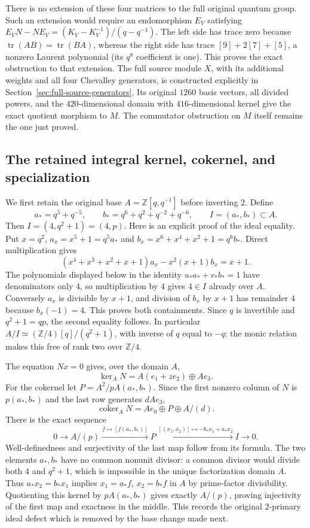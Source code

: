 There is no extension of these four matrices to the full original
quantum group. Such an extension would require an endomorphism $E_V$
satisfying $E_VN-NE_V=(K_V-K_V^{-1})/(q-q^{-1})$. The left side has
trace zero because $\operatorname{tr}(AB)=\operatorname{tr}(BA)$,
whereas the right side has trace $[9]+2[7]+[5]$, a nonzero Laurent
polynomial (its $q^8$ coefficient is one). This proves the exact
obstruction to that extension. The full source module $X$, with
its additional weights and all four Chevalley generators, is constructed
explicitly in Section~\ref{sec:full-source-generators}. Its original
$1260$ basis vectors, all divided powers, and the $420$-dimensional
domain with $416$-dimensional kernel give the exact quotient
morphism to $M$. The commutator obstruction on $M$ itself remains
the one just proved.

\subsection{The retained integral kernel, cokernel, and specialization}

We first retain the original base $A=\mathbb Z[q,q^{-1}]$ before
inverting $2$. Define
\[
 a_*=q^5+q^{-5},\qquad b_*=q^6+q^2+q^{-2}+q^{-6},\qquad
 I=(a_*,b_*)\subset A.
\]
Then $I=(4,q^2+1)=(4,p)$. Here is an explicit proof of the ideal
equality. Put $x=q^2$, $a_x=x^5+1=q^5a_*$ and
$b_x=x^6+x^4+x^2+1=q^6b_*$. Direct multiplication gives
\[
 (x^4+x^3+x^2+x+1)a_x-x^2(x+1)b_x=x+1.
\]
The polynomials displayed below in the identity
$u_*a_*+v_*b_*=1$ have denominators only $4$, so multiplication by
$4$ gives $4\in I$ already over $A$. Conversely $a_x$ is divisible
by $x+1$, and division of $b_x$ by $x+1$ has remainder $4$ because
$b_x(-1)=4$. This proves both containments. Since $q$ is invertible
and $q^2+1=qp$, the second equality follows. In particular
$A/I\simeq(\mathbb Z/4)[q]/(q^2+1)$, with inverse of $q$ equal to
$-q$; the monic relation makes this free of rank two over $\mathbb Z/4$.

The equation $Nx=0$ gives, over the domain $A$,
\[
 \ker_AN=A(e_1+ze_2)\oplus Ae_3.
\]
For the cokernel let $P=A^2/pA(a_*,b_*)$. Since the first nonzero
column of $N$ is $p(a_*,b_*)$ and the last row generates $dAe_3$,
\[
 \operatorname{coker}_AN=Ae_0\oplus P\oplus A/(d).
\]
There is the exact sequence
\[
 0\longrightarrow A/(p)\xrightarrow{\bar f\mapsto[f(a_*,b_*)]}
 P\xrightarrow{[(x_1,x_2)]\mapsto-b_*x_1+a_*x_2} I
 \longrightarrow0.
\]
Well-definedness and surjectivity of the last map follow from its
formula. The two elements $a_*,b_*$ have no common nonunit divisor:
a common divisor would divide both $4$ and $q^2+1$, which is
impossible in the unique factorization domain $A$. Thus
$a_*x_2=b_*x_1$ implies $x_1=a_*f$, $x_2=b_*f$ in $A$ by
prime-factor divisibility. Quotienting this kernel by $pA(a_*,b_*)$
gives exactly $A/(p)$, proving injectivity of the first map and
exactness in the middle. This records the original $2$-primary
ideal defect which is removed by the base change made next.


